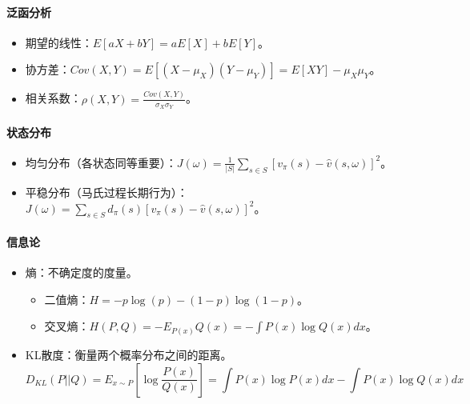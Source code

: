 \documentclass[
12pt, %
a4paper, 
oneside, %
headinclude,footinclude, %
]{scrartcl}
\begin{document}
\paragraph{泛函分析}
\begin{itemize}
\item 期望的线性：$ E[aX + bY] = a E[X] + b E[Y] $。
\item 协方差：$ Cov(X, Y) = E[(X - \mu_X)(Y - \mu_Y)] = E[XY] - \mu_X \mu_Y $。
\item 相关系数：$ \rho(X, Y) = \frac{Cov(X, Y)}{\sigma_X \sigma_Y} $。
\end{itemize}
\paragraph{状态分布}
\begin{itemize}
\item 均匀分布（各状态同等重要）：$ J(\omega) = \frac{1}{|S|}\sum_{s \in S} [v_{\pi}(s) - \hat{v}(s, \omega)]^2 $。
\item 平稳分布（马氏过程长期行为）：$ J(\omega) = \sum_{s \in S} d_{\pi}(s)[v_{\pi}(s) - \hat{v}(s, \omega)]^2 $。
\end{itemize}
\paragraph{信息论}
\begin{itemize}
\item 熵：不确定度的度量。
\begin{itemize}
\item 二值熵：$ H = -p \log(p) - (1 - p)\log(1 - p) $。
\item 交叉熵：$ H(P, Q) = -E_{P(x)} Q(x) = -\int P(x) \log Q(x) dx $。
\end{itemize}
\item KL散度：衡量两个概率分布之间的距离。
$$ D_{KL}(P||Q) = E_{x \sim P}[\log \frac{P(x)}{Q(x)}] = \int P(x) \log P(x) dx - \int P(x) \log Q(x) dx $$
\end{itemize}
\end{document}
